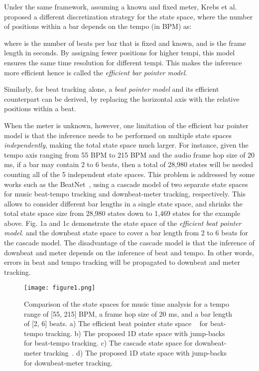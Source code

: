 \documentclass{article}
\begin{document}
Under the same framework, assuming a known and fixed meter, Krebs et al.~\cite{Krebs:1} proposed a different discretization strategy for the state space, where the number of positions within a bar  depends on the tempo  (in BPM) as:

where  is the number of beats per bar that is fixed and known, and  is the frame length in seconds. By assigning fewer positions for higher tempi, this model ensures 
the same time resolution for different tempi.
This makes the inference more efficient hence is called the \textit{efficient bar pointer model}. 

Similarly, for beat tracking alone, a \textit{beat pointer model} and its efficient counterpart can be derived, by replacing the horizontal axis with the relative positions within a beat.





When the meter is unknown, however, one limitation of the efficient bar pointer model is that 
the inference needs to be performed on multiple state spaces \textit{independently}, making the total state space much larger.
For instance, given the tempo axis ranging from 55 BPM to 215 BPM and the audio frame hop size of 20 ms, if a bar may contain 2 to 6 beats, then a total of 28,980 states will be needed counting all of the 5 independent state spaces. This problem is addressed by some works such as the BeatNet~\cite{Heydari:2}, using a cascade model of two separate state spaces for music beat-tempo tracking and downbeat-meter tracking, respectively. 
This allows to consider different bar lengths in a single state space, and shrinks the total state space size from 28,980 states down to 1,469 states for the example above. Fig. 1a and 1c demonstrate the state space of the \textit{efficient beat pointer model}. and the downbeat state space to cover a bar length from 2 to 6 beats for the cascade model. The disadvantage of the cascade model is that the inference of downbeat and meter depends on the inference of beat and tempo. In other words, errors in beat and tempo tracking will be propagated to downbeat and meter tracking.
 
\begin{figure*}[htbp]
 \centerline{
 \texttt{[image: figure1.png]}}
\caption{Comparison of the state spaces for music time analysis for a tempo range of [55, 215] BPM, a frame hop size of 20 ms, and a bar length of [2, 6] beats. a) The efficient beat pointer state space ~\cite{Krebs:1} for beat-tempo tracking. b) The proposed 1D state space with jump-backs for beat-tempo tracking. c) The cascade state space for downbeat-meter tracking~\cite{Heydari:2}. d) The proposed 1D state space with jump-backs for downbeat-meter tracking.}
 \label{fig1}
\end{figure*}
\end{document}
